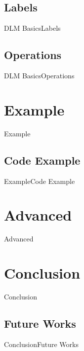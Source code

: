 \documentclass[10pt]{beamer}
\begin{document}
\subsection{Labels}
\begin{frame}{DLM Basics}{Labels}
	
\end{frame}

\subsection{Operations}
\begin{frame}{DLM Basics}{Operations}
\end{frame}

\section{Example}
\begin{frame}{Example}{}
\end{frame}

\subsection{Code Example}
\begin{frame}{Example}{Code Example}
\end{frame}

\section{Advanced}
\begin{frame}{Advanced}{}
\end{frame}

\section{Conclusion}
\begin{frame}{Conclusion}{}
\end{frame}

\subsection{Future Works}
\begin{frame}{Conclusion}{Future Works}
\end{frame}

{\aauwavesbg
\begin{frame}
\end{frame}}
\end{document}
